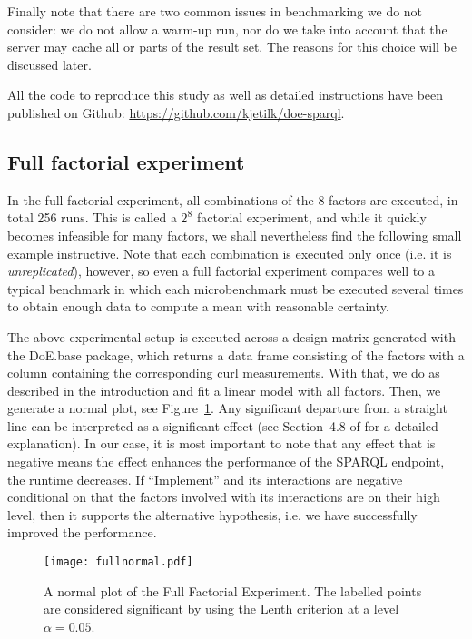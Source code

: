 \documentclass{llncs}
\begin{document}
Finally note that there are two common issues in benchmarking we do
not consider: we do not allow a warm-up run, nor do we take into
account that the server may cache all or parts of the result set. The
reasons for this choice will be discussed later.

All the code to reproduce this study as well as detailed instructions
have been published on Github: \url{https://github.com/kjetilk/doe-sparql}.

\subsection{Full factorial experiment}\label{sec:full}

In the full factorial experiment, all combinations of the 8 factors
are executed, in total 256 runs. This is called a $2^8$ factorial
experiment, and while it quickly becomes infeasible for many factors,
we shall nevertheless find the following small example
instructive. Note that each combination is executed only once (i.e. it
is \emph{unreplicated}), however, so even a full factorial experiment
compares well to a typical benchmark in which each microbenchmark must
be executed several times to obtain enough data to compute a mean with
reasonable certainty.

The above experimental setup is executed across a design matrix
generated with the DoE.base package, which returns a data frame
consisting of the factors with a column containing the corresponding
curl measurements. With that, we do as described in the introduction
and fit a linear model with all factors. Then, we generate a normal
plot, see Figure~\ref{fig:fullnormal}.  Any significant departure from
a straight line can be interpreted as a significant effect (see
Section~4.8 of \cite{wu2009experiments} for a detailed
explanation). In our case, it is most important to note that any
effect that is negative means the effect enhances the performance of
the SPARQL endpoint, the runtime decreases. If ``Implement'' and its
interactions are negative conditional on that the factors involved
with its interactions are on their high level, then it supports the
alternative hypothesis, i.e. we have successfully improved the
performance.

\begin{figure}[t]
  \centerline{%
  \texttt{[image: fullnormal.pdf]}}
  \caption{A normal plot of the Full Factorial Experiment. The
    labelled points are considered significant by using the Lenth
    criterion at a level $\alpha=0.05$.}\label{fig:fullnormal}
\end{figure}
\end{document}
